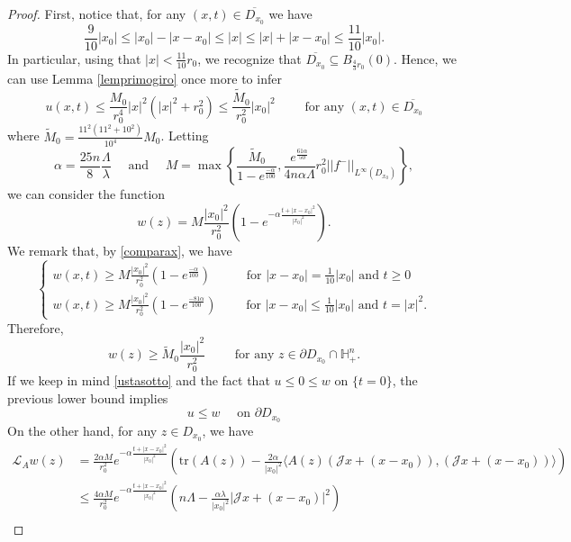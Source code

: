 \documentclass[12pt]{amsart}
\newcommand{\J}{\mathcal{J}}
\def \H {{\mathbb H}}
\def \L {\mathcal{L}}
\begin{document}
\begin{proof}
First, notice that, for any $(x,t)\in \overline{D_{x_0}}$ we have 
\begin{equation}\label{comparax}
\frac{9}{10}|x_0|\leq |x_0|-|x-x_0|\leq |x| \leq |x|+|x-x_0|\leq \frac{11}{10}|x_0|.
\end{equation}
In particular, using that $|x|<\frac{11}{10}r_0$, we recognize that $\overline{D_{x_0}}\subseteq B_{\frac{4}{3}r_0}(0)$. Hence, we can use Lemma \ref{lemprimogiro} once more to infer
\begin{equation}\label{ustasotto}
u(x,t)\leq \frac{M_0}{r_0^4}|x|^2(|x|^2+r_0^2)\leq \frac{\tilde{M}_0}{r_0^2}|x_0|^2 \qquad\mbox{ for any }(x,t)\in \overline{D_{x_0}}
\end{equation}
where $\tilde{M}_0=\frac{11^2(11^2+10^2)}{10^4} M_0$. Letting
$$
\alpha=\frac{25n}{8}\frac{\Lambda}{\lambda}
\quad\mbox{ and }\quad M=\max\left\{\frac{\tilde{M}_0}{1- e^{\frac{-\alpha}{100}}}, \frac{e^{\frac{61\alpha}{50}}}{4n\alpha\Lambda} r^2_0 ||f^-||_{L^\infty(D_{x_0})} \right\},%
$$
we can consider the function
$$
w(z)=M \frac{|x_0|^2}{r^2_0} \left( 1- e^{-\alpha\frac{t+|x-x_0|^2}{|x_0|^2}}\right).
$$
We remark that, by \eqref{comparax}, we have
$$
\begin{cases}
w(x,t) \geq M \frac{|x_0|^2}{r^2_0} \left( 1- e^{\frac{-\alpha}{100}}\right) \qquad\,\,\,\mbox{ for } |x-x_0|=\frac{1}{10}|x_0|\mbox{ and }t\geq 0  \\
w(x,t)\geq M \frac{|x_0|^2}{r^2_0} \left( 1- e^{\frac{-81\alpha}{100}}\right) \qquad\mbox{ for } |x-x_0|\leq \frac{1}{10}|x_0|\mbox{ and }t=|x|^2.
\end{cases}
$$
Therefore,
$$
w(z)\geq \tilde{M}_0 \frac{|x_0|^2}{r^2_0}\qquad\mbox{ for any }z\in \partial D_{x_0}\cap \H^n_+.
$$
If we keep in mind \eqref{ustasotto} and the fact that $u\leq 0\leq w$ on $\{t=0\}$, the previous lower bound implies
\begin{equation}\label{ustasottoalbordo}
u\leq w\quad\mbox{ on }\partial D_{x_0}
\end{equation}
On the other hand, for any $z\in D_{x_0}$, we have
\begin{align*}
\L_A w (z)&= 
\frac{2\alpha M}{r_0^2}e^{-\alpha\frac{t+|x-x_0|^2}{|x_0|^2}}\left( \text{tr}(A(z)) -\frac{2\alpha}{|x_0|^2}\langle A(z)\left(\J x + (x-x_0)\right),\left(\J x + (x-x_0)\right) \rangle\right) \\
&\leq \frac{4\alpha M}{r_0^2}e^{-\alpha\frac{t+|x-x_0|^2}{|x_0|^2}}\left( n\Lambda -\frac{\alpha\lambda}{|x_0|^2}\left|\J x + (x-x_0)\right|^2 \right) \\

\end{align*}
\end{proof}
\end{document}

